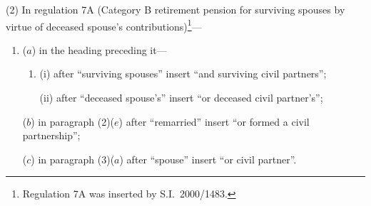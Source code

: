\documentclass[12pt,a4paper]{article}
\begin{document}
(2) In regulation 7A (Category B retirement pension for surviving spouses by virtue of deceased spouse’s contributions)\footnote{Regulation 7A was inserted by S.I.\ 2000/1483.}—
\begin{enumerate}\item[]
($a$) in the heading preceding it—
\begin{enumerate}\item[]
(i) after “surviving spouses” insert “and surviving civil partners”;

(ii) after “deceased spouse's” insert “or deceased civil partner's”;
\end{enumerate}

($b$) in paragraph (2)($e$)  after “remarried” insert “or formed a civil partnership”;

($c$) in paragraph (3)($a$)  after “spouse” insert “or civil partner”.
\end{enumerate}
\end{document}
